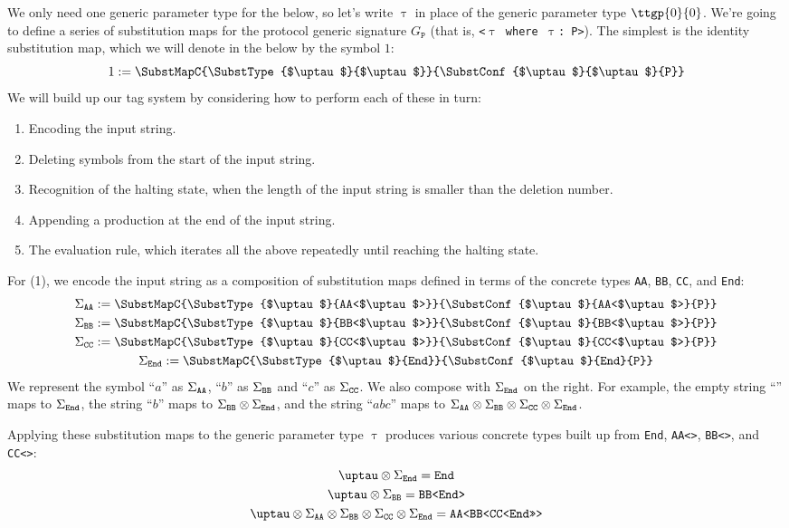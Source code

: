 \documentclass[../generics]{subfiles}
\begin{document}
We only need one generic parameter type for the below, so let's write $\uptau$ in place of the generic parameter type $\ttgp{0}{0}$. We're going to define a series of substitution maps for the protocol generic signature $G_\texttt{P}$ (that is, \texttt{<$\uptau$ where $\uptau$:~P>}). The simplest is the identity substitution map, which we will denote in the below by the symbol $1$:
\[1 := \SubstMapC{\SubstType{$\uptau$}{$\uptau$}}{\SubstConf{$\uptau$}{$\uptau$}{P}}\]
We will build up our tag system by considering how to perform each of these in turn:
\begin{enumerate}
\item Encoding the input string.
\item Deleting symbols from the start of the input string.
\item Recognition of the halting state, when the length of the input string is smaller than the deletion number.
\item Appending a production at the end of the input string.
\item The evaluation rule, which iterates all the above repeatedly until reaching the halting state.
\end{enumerate}

For (1), we encode the input string as a composition of substitution maps defined in terms of the concrete types \texttt{AA}, \texttt{BB}, \texttt{CC}, and \texttt{End}:
\begin{gather*}
\SigmaAA := \SubstMapC{\SubstType{$\uptau$}{AA<$\uptau$>}}{\SubstConf{$\uptau$}{AA<$\uptau$>}{P}}\\
\SigmaBB := \SubstMapC{\SubstType{$\uptau$}{BB<$\uptau$>}}{\SubstConf{$\uptau$}{BB<$\uptau$>}{P}}\\
\SigmaCC := \SubstMapC{\SubstType{$\uptau$}{CC<$\uptau$>}}{\SubstConf{$\uptau$}{CC<$\uptau$>}{P}}\\
\SigmaEnd := \SubstMapC{\SubstType{$\uptau$}{End}}{\SubstConf{$\uptau$}{End}{P}}
\end{gather*}
We represent the symbol ``$a$'' as $\Sigma_{\texttt{AA}}$, ``$b$'' as $\Sigma_{\texttt{BB}}$ and ``$c$'' as $\Sigma_{\texttt{CC}}$. We also compose with $\Sigma_{\texttt{End}}$ on the right. For example, the empty string ``'' maps to $\Sigma_{\texttt{End}}$, the string ``$b$'' maps to $\Sigma_{\texttt{BB}}\otimes\Sigma_{\texttt{End}}$, and the string ``$abc$'' maps to $\Sigma_{\texttt{AA}}\otimes\Sigma_{\texttt{BB}}\otimes\Sigma_{\texttt{CC}}\otimes\Sigma_{\texttt{End}}$.

Applying these substitution maps to the generic parameter type $\uptau$ produces various concrete types built up from \texttt{End}, \texttt{AA<>}, \texttt{BB<>}, and \texttt{CC<>}:
\begin{gather*}
\uptau\otimes\SigmaEnd = \texttt{End}\\
\uptau\otimes\SigmaBB = \texttt{BB<End>}\\
\uptau\otimes\SigmaAA\otimes\SigmaBB\otimes\SigmaCC\otimes\SigmaEnd = \texttt{AA<BB<CC<End>>>}
\end{gather*}
\end{document}
